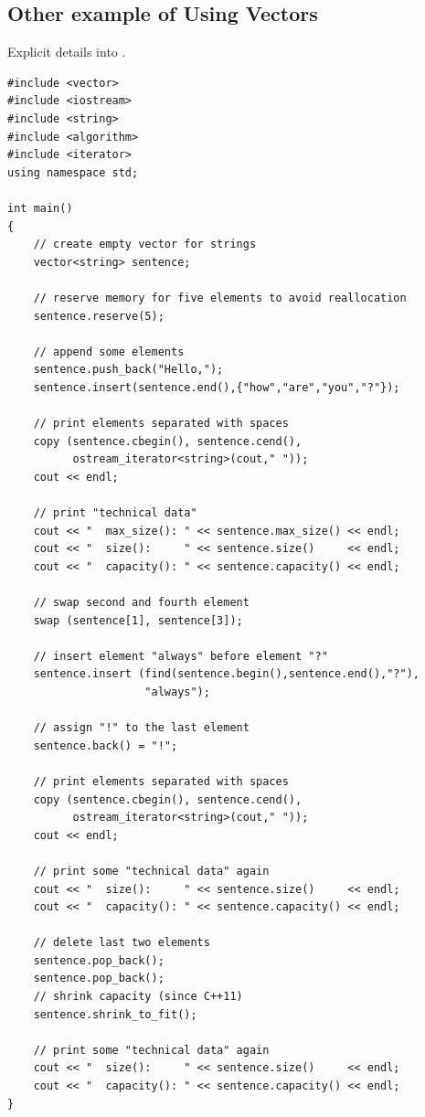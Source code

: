 \documentclass[12pt]{report}
\begin{document}
\subsection{Other example of Using Vectors}
Explicit details into \cite{cppstdlib}.

\begin{lstlisting}[style=CStyle]
#include <vector>
#include <iostream>
#include <string>
#include <algorithm>
#include <iterator>
using namespace std;

int main()
{
    // create empty vector for strings
    vector<string> sentence;

    // reserve memory for five elements to avoid reallocation
    sentence.reserve(5);

    // append some elements
    sentence.push_back("Hello,");
    sentence.insert(sentence.end(),{"how","are","you","?"});

    // print elements separated with spaces
    copy (sentence.cbegin(), sentence.cend(),
          ostream_iterator<string>(cout," "));
    cout << endl;

    // print "technical data"
    cout << "  max_size(): " << sentence.max_size() << endl;
    cout << "  size():     " << sentence.size()     << endl;
    cout << "  capacity(): " << sentence.capacity() << endl;

    // swap second and fourth element
    swap (sentence[1], sentence[3]);

    // insert element "always" before element "?"
    sentence.insert (find(sentence.begin(),sentence.end(),"?"),
                     "always");

    // assign "!" to the last element
    sentence.back() = "!";
    
    // print elements separated with spaces
    copy (sentence.cbegin(), sentence.cend(),
          ostream_iterator<string>(cout," "));
    cout << endl;

    // print some "technical data" again
    cout << "  size():     " << sentence.size()     << endl;
    cout << "  capacity(): " << sentence.capacity() << endl;

    // delete last two elements
    sentence.pop_back();
    sentence.pop_back();
    // shrink capacity (since C++11)
    sentence.shrink_to_fit();

    // print some "technical data" again
    cout << "  size():     " << sentence.size()     << endl;
    cout << "  capacity(): " << sentence.capacity() << endl;
}


\end{lstlisting}
\end{document}
